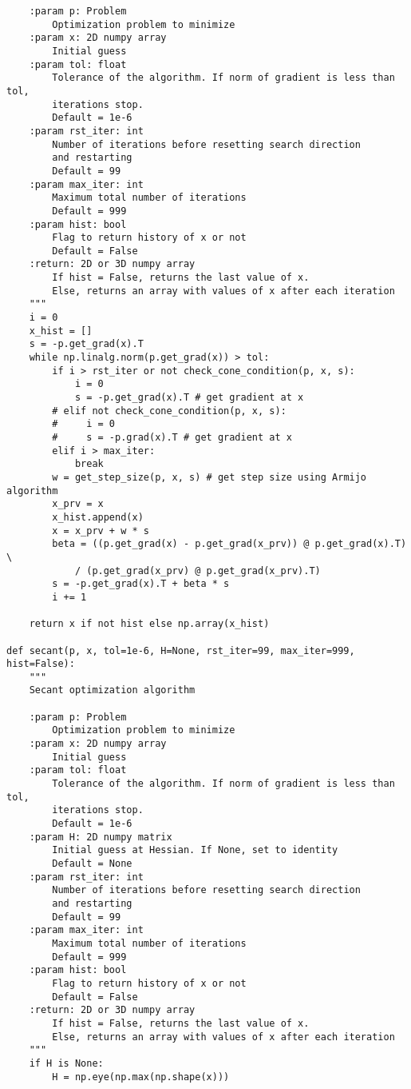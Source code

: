 \begin{lstlisting}
    :param p: Problem
        Optimization problem to minimize
    :param x: 2D numpy array
        Initial guess
    :param tol: float
        Tolerance of the algorithm. If norm of gradient is less than tol,
        iterations stop.
        Default = 1e-6
    :param rst_iter: int
        Number of iterations before resetting search direction
        and restarting
        Default = 99
    :param max_iter: int
        Maximum total number of iterations
        Default = 999
    :param hist: bool
        Flag to return history of x or not
        Default = False
    :return: 2D or 3D numpy array
        If hist = False, returns the last value of x.
        Else, returns an array with values of x after each iteration
    """
    i = 0
    x_hist = []
    s = -p.get_grad(x).T
    while np.linalg.norm(p.get_grad(x)) > tol:
        if i > rst_iter or not check_cone_condition(p, x, s):
            i = 0
            s = -p.get_grad(x).T # get gradient at x
        # elif not check_cone_condition(p, x, s):
        #     i = 0
        #     s = -p.grad(x).T # get gradient at x
        elif i > max_iter:
            break
        w = get_step_size(p, x, s) # get step size using Armijo algorithm
        x_prv = x
        x_hist.append(x)
        x = x_prv + w * s
        beta = ((p.get_grad(x) - p.get_grad(x_prv)) @ p.get_grad(x).T) \
            / (p.get_grad(x_prv) @ p.get_grad(x_prv).T)
        s = -p.get_grad(x).T + beta * s
        i += 1

    return x if not hist else np.array(x_hist)

def secant(p, x, tol=1e-6, H=None, rst_iter=99, max_iter=999, hist=False):
    """
    Secant optimization algorithm

    :param p: Problem
        Optimization problem to minimize
    :param x: 2D numpy array
        Initial guess
    :param tol: float
        Tolerance of the algorithm. If norm of gradient is less than tol,
        iterations stop.
        Default = 1e-6
    :param H: 2D numpy matrix
        Initial guess at Hessian. If None, set to identity
        Default = None
    :param rst_iter: int
        Number of iterations before resetting search direction
        and restarting
        Default = 99
    :param max_iter: int
        Maximum total number of iterations
        Default = 999
    :param hist: bool
        Flag to return history of x or not
        Default = False
    :return: 2D or 3D numpy array
        If hist = False, returns the last value of x.
        Else, returns an array with values of x after each iteration
    """
    if H is None:
        H = np.eye(np.max(np.shape(x)))


\end{lstlisting}
